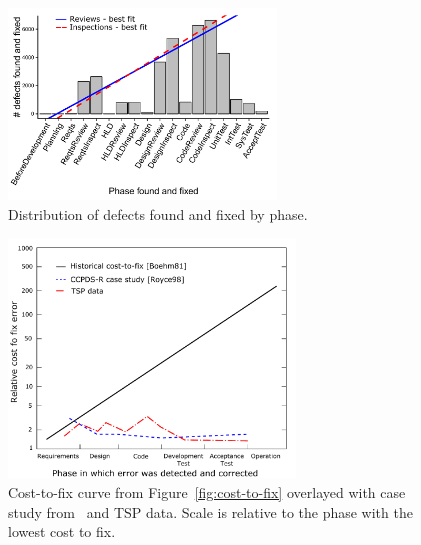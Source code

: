 \documentclass{sig-alternate}
\newcommand{\todo}[1]{\textcolor{Maroon}{TODO: #1}}
\newcommand{\bi}{\begin{itemize}[leftmargin=0.4cm]}
\newcommand{\ei}{\end{itemize}}
\newcommand{\fig}[1]{Figure~\ref{fig:#1}}
\begin{document}

 
 

\begin{figure}[!t] 

\begin{center}
\includegraphics[height=2in]{fix-phase-dist.pdf}
\end{center}

\caption{Distribution of defects found and fixed by phase.}
\label{fig:fix-phase-dist}
\end{figure}



\begin{figure}[!t] 
\begin{center}
\includegraphics[width=3in]{boehm-overlay.pdf}
 \end{center}
 
 \caption{Cost-to-fix curve from \protect\fig{cost-to-fix} 
 overlayed with case study from~\cite{Royce98} and TSP data. Scale is relative to the phase with the lowest cost to fix. }\label{fig:cost-to-fix-tsp}
 \end{figure}
\end{document}
